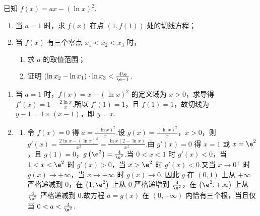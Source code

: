 \begin{problem}
已知 \(f(x)=ax-(\ln x)^2\).
\begin{enumerate}
\item 当 \(a=1\) 时，求 \(f(x)\) 在点 \((1,f(1))\) 处的切线方程；
\item 当 \(f(x)\) 有三个零点 \(x_1<x_2<x_3\) 时，
\begin{enumerate}
    \item 求 \(a\) 的取值范围；
    \item 证明 \((\ln x_2-\ln x_1)\cdot \ln x_3<\frac{4\e}{\e-1}\).
\end{enumerate}
\end{enumerate}
\end{problem}

\begin{solution}
\begin{enumerate}
\item 当 \(a=1\) 时，\(f\left(x\right)=x-\left(\ln x\right)^2\) 的定义域为 \(x>0\)，求导得 \(f'\left(x\right)=1-\frac{2\ln x}{x}\).所以 \(f'\left(1\right)=1\)，且 \(f\left(1\right)=1\)，故切线为 \(y-1=1\times\left(x-1\right)\)，即 \(y=x\).
\item
\begin{enumerate}
\item 令 \(f\left(x\right)=0\) 得 \(a=\frac{\left(\ln x\right)^2}{x}\).设 \(g\left(x\right)=\frac{\left(\ln x\right)^2}{x}\)，\(x>0\)，则 \(g'\left(x\right)=\frac{2\ln x-\left(\ln x\right)^2}{x^2}=\frac{\ln x\left(2-\ln x\right)}{x^2}\).由 \(g'\left(x\right)=0\) 得 \(x=1\) 或 \(x=\e^2\)，且 \(g\left(1\right)=0\)，\(g\left(\e^2\right)=\frac{4}{\e^2}\).当 \(0<x<1\) 时 \(g'\left(x\right)<0\)，当 \(1<x<\e^2\) 时 \(g'\left(x\right)>0\)，当 \(x>\e^2\) 时 \(g'\left(x\right)<0\).又当 \(x\to 0^+\) 时 \(g\left(x\right)\to +\infty\)，当 \(x\to +\infty\) 时 \(g\left(x\right)\to 0\).
因此 \(g\) 在 \(\left(0,1\right)\) 上从 \(+\infty\) 严格递减到 \(0\)，在 \(\left(1,\e^2\right)\) 上从 \(0\) 严格递增到 \(\frac{4}{\e^2}\)，在 \(\left(\e^2,+\infty\right)\) 上从 \(\frac{4}{\e^2}\) 严格递减到 \(0\).故方程 \(a=g\left(x\right)\) 在 \(\left(0,+\infty\right)\) 内恰有三个根，当且仅当 \(0<a<\frac{4}{\e^2}\).

\end{enumerate}
\end{enumerate}
\end{solution}
